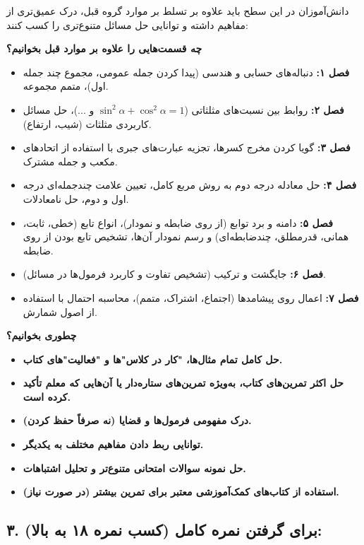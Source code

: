 \documentclass[12pt,a4paper]{article}
\begin{document}
دانش‌آموزان در این سطح باید علاوه بر تسلط بر موارد گروه قبل، درک عمیق‌تری از مفاهیم داشته و توانایی حل مسائل متنوع‌تری را کسب کنند:

\textbf{چه قسمت‌هایی را علاوه بر موارد قبل بخوانیم؟}
\begin{itemize}
    \item \textbf{فصل ۱:} دنباله‌های حسابی و هندسی (پیدا کردن جمله عمومی، مجموع چند جمله اول)، متمم مجموعه.
    \item \textbf{فصل ۲:} روابط بین نسبت‌های مثلثاتی ($\sin^2\alpha + \cos^2\alpha = 1$ و ...)، حل مسائل کاربردی مثلثات (شیب، ارتفاع).
    \item \textbf{فصل ۳:} گویا کردن مخرج کسرها، تجزیه عبارت‌های جبری با استفاده از اتحادهای مکعب و جمله مشترک.
    \item \textbf{فصل ۴:} حل معادله درجه دوم به روش مربع کامل، تعیین علامت چندجمله‌ای درجه اول و دوم، حل نامعادلات.
    \item \textbf{فصل ۵:} دامنه و برد توابع (از روی ضابطه و نمودار)، انواع تابع (خطی، ثابت، همانی، قدرمطلق، چندضابطه‌ای) و رسم نمودار آن‌ها، تشخیص تابع بودن از روی ضابطه.
    \item \textbf{فصل ۶:} جایگشت و ترکیب (تشخیص تفاوت و کاربرد فرمول‌ها در مسائل).
    \item \textbf{فصل ۷:} اعمال روی پیشامدها (اجتماع، اشتراک، متمم)، محاسبه احتمال با استفاده از اصول شمارش.
\end{itemize}

\textbf{چطوری بخوانیم؟}
\begin{itemize}
    \item \textbf{حل کامل تمام مثال‌ها، "کار در کلاس"ها و "فعالیت"های کتاب.}
    \item \textbf{حل اکثر تمرین‌های کتاب، به‌ویژه تمرین‌های ستاره‌دار یا آن‌هایی که معلم تأکید کرده است.}
    \item \textbf{درک مفهومی فرمول‌ها و قضایا (نه صرفاً حفظ کردن).}
    \item \textbf{توانایی ربط دادن مفاهیم مختلف به یکدیگر.}
    \item \textbf{حل نمونه سوالات امتحانی متنوع‌تر و تحلیل اشتباهات.}
    \item \textbf{استفاده از کتاب‌های کمک‌آموزشی معتبر برای تمرین بیشتر (در صورت نیاز).}
\end{itemize}

\subsection*{۳. برای گرفتن نمره کامل (کسب نمره ۱۸ به بالا):}
\end{document}
